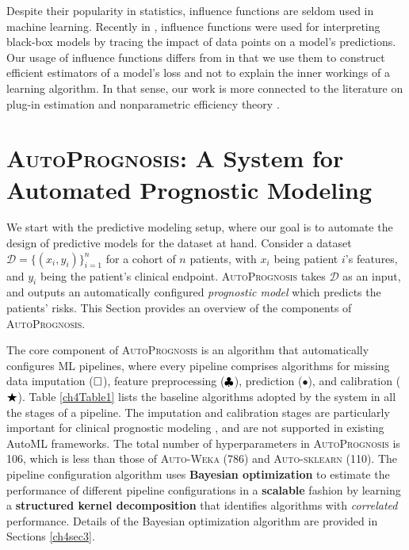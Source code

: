\documentclass [PhD] {uclathes}
\begin{document}
Despite their popularity in statistics, influence functions are seldom used in machine learning. Recently in \cite{koh2017understanding}, influence functions were used for interpreting black-box models by tracing the impact of data points on a model's predictions. Our usage of influence functions differs from \cite{koh2017understanding} in that we use them to construct efficient estimators of a model's loss and not to explain the inner workings of a learning algorithm. In that sense, our work is more connected to the literature on plug-in estimation and nonparametric efficiency theory \cite{goldstein1992optimal,robins2008higher,robins2017minimax,van2014higher}.     

\section{\textsc{AutoPrognosis}: A System for Automated Prognostic Modeling}
\label{ch4sec2}
We start with the predictive modeling setup, where our goal is to automate the design of predictive models for the dataset at hand. Consider a dataset $\mathcal{D} = \{(x_i,y_i)\}^n_{i=1}$ for a cohort of $n$ patients, with $x_i$ being patient $i$'s features, and $y_i$ being the patient's clinical endpoint. {\footnotesize \textsc{AutoPrognosis}} takes $\mathcal{D}$ as an input, and outputs an automatically configured {\it prognostic model} which predicts the patients' risks. This Section provides an overview of the components of {\footnotesize \textsc{AutoPrognosis}}.  

The core component of {\footnotesize \textsc{AutoPrognosis}} is an algorithm that automatically configures ML pipelines, where every pipeline comprises algorithms for missing data imputation (${\tiny \square}$), feature preprocessing (${\tiny \clubsuit}$), prediction ($\bullet$), and calibration (${\tiny \bigstar}$). Table \ref{ch4Table1} lists the baseline algorithms adopted by the system in all the stages of a pipeline. The imputation and calibration stages are particularly important for clinical prognostic modeling \cite{blaha2016critical}, and are not supported in existing AutoML frameworks. The total number of hyperparameters in {\footnotesize \textsc{AutoPrognosis}} is 106, which is less than those of {\footnotesize \textsc{Auto-Weka}} (786) and {\footnotesize \textsc{Auto-sklearn}} (110). The pipeline configuration algorithm uses {\bf Bayesian optimization} to estimate the performance of different pipeline configurations in a {\bf scalable} fashion by learning a {\bf structured kernel decomposition} that identifies algorithms with {\it correlated} performance. Details of the Bayesian optimization algorithm are provided in Sections \ref{ch4sec3}.
\end{document}

